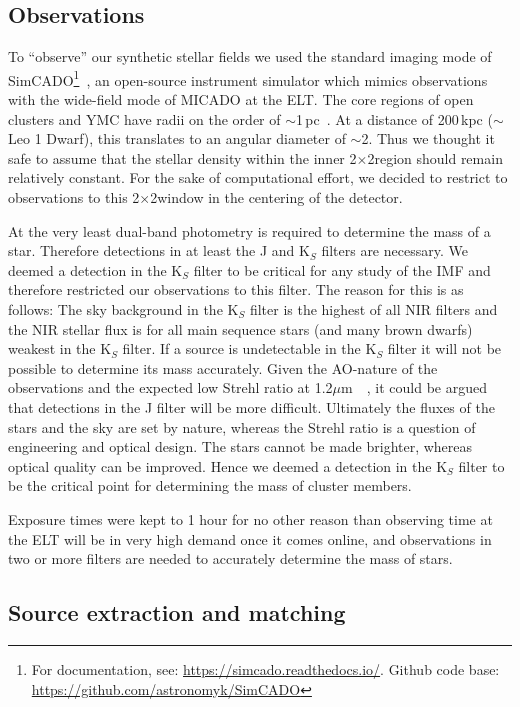 \documentclass{aa}
\newcommand{\um}{$\mu$m~}
\newcommand{\s}{$\sim$}
\begin{document}
\subsection{Observations}
\label{sec:telescope}

To ``observe'' our synthetic stellar fields we used the standard imaging mode of SimCADO\footnote{For documentation, see: \url{https://simcado.readthedocs.io/}.
Github code base: \url{https://github.com/astronomyk/SimCADO}}~\citep{leschinski2016}, an open-source instrument simulator which mimics observations with the wide-field mode of MICADO at the ELT\@.
The core regions of open clusters and YMC have radii on the order of \s1\,pc~\citep{portegies2010}.
At a distance of 200\,kpc ($\sim$Leo 1 Dwarf), this translates to an angular diameter of \s2\arcsec.
Thus we thought it safe to assume that the stellar density within the inner 2\arcsec$\times$2\arcsec region should remain relatively constant.
For the sake of computational effort, we decided to restrict to observations to this 2\arcsec$\times$2\arcsec window in the centering of the detector.

At the very least dual-band photometry is required to determine the mass of a star.
Therefore detections in at least the J and K$_S$ filters are necessary.
We deemed a detection in the K$_S$ filter to be critical for any study of the IMF and therefore restricted our observations to this filter.
The reason for this is as follows: The sky background in the K$_S$ filter is the highest of all NIR filters and the NIR stellar flux is for all main sequence stars (and many brown dwarfs) weakest in the K$_S$ filter.
If a source is undetectable in the K$_S$ filter it will not be possible to determine its mass accurately.
Given the AO-nature of the observations and the expected low Strehl ratio at 1.2\um~\citep{clenet2016}, it could be argued that detections in the J filter will be more difficult.
Ultimately the fluxes of the stars and the sky are set by nature, whereas the Strehl ratio is a question of engineering and optical design.
The stars cannot be made brighter, whereas optical quality can be improved.
Hence we deemed a detection in the K$_S$ filter to be the critical point for determining the mass of cluster members.

Exposure times were kept to 1 hour for no other reason than observing time at the ELT will be in very high demand once it comes online, and observations in two or more filters are needed to accurately determine the mass of stars.


\subsection{Source extraction and matching}
\label{subsec:source_extraction}
\end{document}
